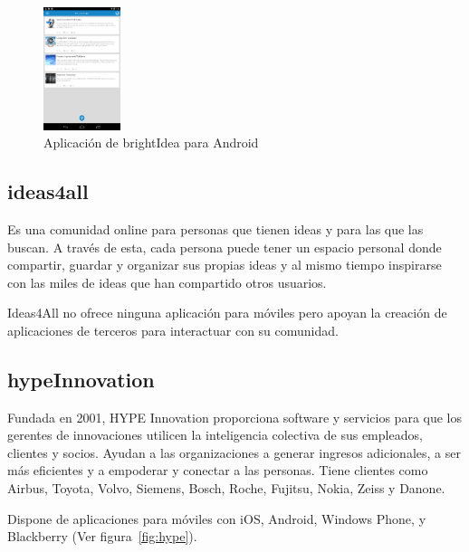 \begin{figure}[!h]
\begin{center}
		\includegraphics[width=0.2\textwidth]{./img/competencia/brightIdea/6.png}
		\caption{Aplicación de brightIdea para Android}
		\label{fig:brightIdea}
	\end{center}
\end{figure}

\subsection{ideas4all}

Es una comunidad online para personas que tienen ideas y para las que las buscan. A través de esta, cada persona puede tener un espacio personal donde compartir, guardar y organizar sus propias ideas y al mismo tiempo inspirarse con las miles de ideas que han compartido otros usuarios.

Ideas4All no ofrece ninguna aplicación para móviles pero apoyan la creación de aplicaciones de terceros 
para interactuar con su comunidad.


\subsection{hypeInnovation}

Fundada en 2001, HYPE Innovation proporciona software y servicios para que los gerentes de innovaciones utilicen la inteligencia colectiva de sus empleados, clientes y socios. Ayudan a las organizaciones a generar ingresos adicionales, a ser más eficientes y a empoderar y conectar a las personas. Tiene clientes como Airbus, Toyota, Volvo, Siemens, Bosch, Roche, Fujitsu, Nokia, Zeiss y Danone.

Dispone de aplicaciones para móviles con iOS, Android, Windows Phone, y Blackberry (Ver figura~\ref{fig:hype}).

